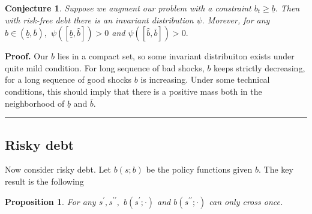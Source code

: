 \documentclass{article}
\newtheorem{conjecture}[theorem]{Conjecture}
\newtheorem{proposition}[theorem]{Proposition}
\newenvironment{proof}[1][Proof]{\noindent\textbf{#1.} }{\ \rule{0.5em}{0.5em}}
\begin{document}
\begin{conjecture}
\label{prop: invariant risk free}Suppose we augment our problem with a
constraint $b_{t}\geq \underline{b}.$ Then with risk-free debt there is an
invariant distribution $\psi .$ Morever, for any $\hat{b}\in \left( 
\underline{b},\bar{b}\right) ,$ $\psi \left( \left[ \underline{b},\hat{b}%
\right] \right) >0$ and $\psi \left( \left[ \hat{b},\bar{b}\right] \right)
>0.$
\end{conjecture}

\begin{proof}
\smallskip Our $b$ lies in a compact set, so some invariant distribuiton
exists under quite mild condition. For long sequence of bad shocks, $b$
keeps strictly decreasing, for a long sequence of good shocks $b$ is
increasing. Under some technical conditions, this should imply that there is
a positive mass both in the neighborhood of $\underline{b}$ and $\bar{b}.$
\end{proof}

\smallskip

\subsection{\protect\smallskip Risky debt}

Now consider risky debt. Let $b\left( s;b\right) $ be the policy functions
given $b.$ The key result is the following

\begin{proposition}
For any $s^{\prime },s^{\prime \prime },$ $b\left( s^{\prime };\cdot \right) 
$ and $b\left( s^{\prime \prime };\cdot \right) $ can only cross once.
\end{proposition}
\end{document}
